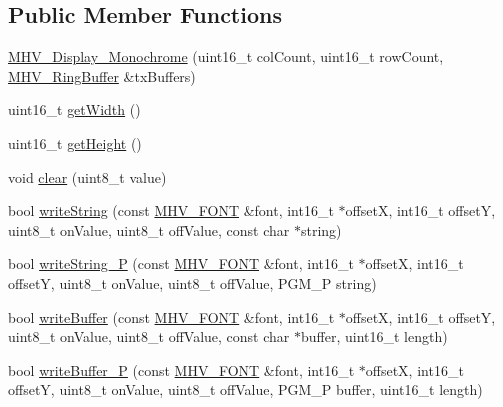 \subsection*{\-Public \-Member \-Functions}
\begin{DoxyCompactItemize}
\item 
\hyperlink{class_m_h_v___display___monochrome_ae9bac3772b5baa006b04121c0caf0d8b}{\-M\-H\-V\-\_\-\-Display\-\_\-\-Monochrome} (uint16\-\_\-t col\-Count, uint16\-\_\-t row\-Count, \hyperlink{class_m_h_v___ring_buffer}{\-M\-H\-V\-\_\-\-Ring\-Buffer} \&tx\-Buffers)
\item 
uint16\-\_\-t \hyperlink{class_m_h_v___display___monochrome_a1ef9b1ddbc9e57007903076005335211}{get\-Width} ()
\item 
uint16\-\_\-t \hyperlink{class_m_h_v___display___monochrome_a988a98e01d54b12d3dcecc2d7878a985}{get\-Height} ()
\item 
void \hyperlink{class_m_h_v___display___monochrome_a25b062aefde440ad5c47dbca98b5b478}{clear} (uint8\-\_\-t value)
\item 
bool \hyperlink{class_m_h_v___display___monochrome_a4f56f6dd2d51352e527f53bb244e3543}{write\-String} (const \hyperlink{_m_h_v___font_8h_ab7088ba808ac223275dfd526d198356f}{\-M\-H\-V\-\_\-\-F\-O\-N\-T} \&font, int16\-\_\-t $\ast$offset\-X, int16\-\_\-t offset\-Y, uint8\-\_\-t on\-Value, uint8\-\_\-t off\-Value, const char $\ast$string)
\item 
bool \hyperlink{class_m_h_v___display___monochrome_acacf2c72fd60a1a7cbdcf25e1cd93920}{write\-String\-\_\-\-P} (const \hyperlink{_m_h_v___font_8h_ab7088ba808ac223275dfd526d198356f}{\-M\-H\-V\-\_\-\-F\-O\-N\-T} \&font, int16\-\_\-t $\ast$offset\-X, int16\-\_\-t offset\-Y, uint8\-\_\-t on\-Value, uint8\-\_\-t off\-Value, \-P\-G\-M\-\_\-\-P string)
\item 
bool \hyperlink{class_m_h_v___display___monochrome_a68bf57213233e288474c9b51491452df}{write\-Buffer} (const \hyperlink{_m_h_v___font_8h_ab7088ba808ac223275dfd526d198356f}{\-M\-H\-V\-\_\-\-F\-O\-N\-T} \&font, int16\-\_\-t $\ast$offset\-X, int16\-\_\-t offset\-Y, uint8\-\_\-t on\-Value, uint8\-\_\-t off\-Value, const char $\ast$buffer, uint16\-\_\-t length)
\item 
bool \hyperlink{class_m_h_v___display___monochrome_ad2318af5f3a5f7db01debd52a5bc4bc1}{write\-Buffer\-\_\-\-P} (const \hyperlink{_m_h_v___font_8h_ab7088ba808ac223275dfd526d198356f}{\-M\-H\-V\-\_\-\-F\-O\-N\-T} \&font, int16\-\_\-t $\ast$offset\-X, int16\-\_\-t offset\-Y, uint8\-\_\-t on\-Value, uint8\-\_\-t off\-Value, \-P\-G\-M\-\_\-\-P buffer, uint16\-\_\-t length)

\end{DoxyCompactItemize}
